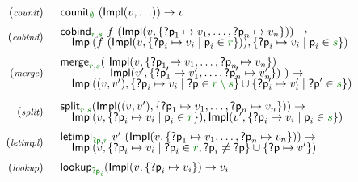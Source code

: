 \begin{figure}[h!]
\begin{equation*}
\begin{array}{rl}
{\footnotesize(\emph{counit})} & \begin{array}{l}
\ident{counit}_{\cclrd{ \emptyset }}~(\ident{Impl} (v, \ldots))   \rightarrow v
\end{array}
\\[0.5em]
{\footnotesize(\emph{cobind})} & \begin{array}{l}
\ident{cobind}_{\cclrd{r}, \cclrd{s}}~f~(\ident{Impl}(v, \{ \ident{?p}_1 \mapsto v_1, \ldots, \ident{?p}_{n}\mapsto v_n \})) \rightarrow
\\[-0.25em]
\quad \ident{Impl}(f~(\ident{Impl}(v, \{ \ident{?p}_i \mapsto v_i \;|\; \ident{p}_i \in \cclrd{r} \} )), \{ \ident{?p}_i \mapsto v_i \;|\; \ident{p}_i \in \cclrd{s} \} )
\end{array}
\\[1em]
{\footnotesize(\emph{merge})} & \begin{array}{l}
\ident{merge}_{\cclrd{r}, \cclrd{s}} 
              (~\ident{Impl}(v, \{ \ident{?p}_1 \mapsto v_1, \ldots, \ident{?p}_{n}\mapsto v_n \})  \\[-0.25em]
\hspace{4.4em}    \ident{Impl}(v', \{ \ident{?p}'_1 \mapsto v'_1, \ldots, \ident{?p}'_{n}\mapsto v'_n \})~) \rightarrow \\[-0.25em]
\quad \ident{Impl}((v, v'), \{ \ident{?p}_i \mapsto v_i \;|\; \ident{?p}\in\cclrd{r \setminus s}  \} \cup \{ \ident{?p}'_i \mapsto v'_i \;|\; \ident{?p}'\in\cclrd{s}  \})
\end{array}
\\[1.75em]
{\footnotesize(\emph{split})} & \begin{array}{l}
\ident{split}_{\cclrd{r}, \cclrd{s}} (\ident{Impl}((v,v'), \{ \ident{?p}_1 \mapsto v_1, \ldots, \ident{?p}_{n}\mapsto v_n \}))  \rightarrow
\\[-0.25em]
\quad \ident{Impl}(v, \{ \ident{?p}_i \mapsto v_i \;|\; \ident{p}_i \in \cclrd{r} \} ), \ident{Impl}(v', \{ \ident{?p}_i \mapsto v_i \;|\; \ident{p}_i \in \cclrd{s} \} )
\end{array}
\\[1em]
{\footnotesize(\emph{letimpl})} & \begin{array}{l}
\ident{letimpl}_{\cclrd{\ident{?p}}, \cclrd{r}}~v'~(\ident{Impl}(v, \{ \ident{?p}_1 \mapsto v_1, \ldots, \ident{?p}_{n}\mapsto v_n \}))  \rightarrow
\\[-0.25em]
\quad \ident{Impl}(v, \{ \ident{?p}_i \mapsto v_i\;|\; \ident{?p}_i \in \cclrd{r}, \ident{?p}_i \neq \ident{?p} \} \cup \{ \ident{?p} \mapsto v' \} )
\end{array}
\\[1em]
{\footnotesize(\emph{lookup})} & \begin{array}{l}
\ident{lookup}_{\cclrd{\ident{?p}_i}} (\ident{Impl}(v, \{\ident{?p}_i\mapsto v_i\}) \rightarrow v_i
\end{array}
\end{array}
\end{equation*}


\end{figure}
